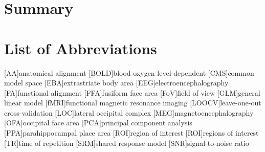 \documentclass[english,12pt]{report}
\begin{document}
\begin{spacing}{1.5}





\chapter*{Summary}





\chapter*{List of Abbreviations}



\renewcommand{\baselinestretch}{0.75}\normalsize

\begin{acronym}[longest]
    [AA]{anatomical alignment}
    [BOLD]{blood oxygen level-dependent}
    [CMS]{common model space}
    [EBA]{extrastriate body area}
    [EEG]{electroencephalography}
    [FA]{functional alignment}
    [FFA]{fusiform face area}
    [FoV]{field of view}
    [GLM]{general linear model}
    [fMRI]{functional magnetic resonance imaging}
    [LOOCV]{leave-one-out cross-validation}
    [LOC]{lateral occipital complex}
    [MEG]{magnetoencephalography}
    [OFA]{occipital face area}
    [PCA]{principal component analysis}
    [PPA]{parahippocampal place area}
    [ROI]{region of interest}
    [ROI]{regions of interest}
    [TR]{time of repetition}
    [SRM]{shared response model}
    [SNR]{signal-to-noise ratio}
\end{acronym}


\end{spacing}
\end{document}
